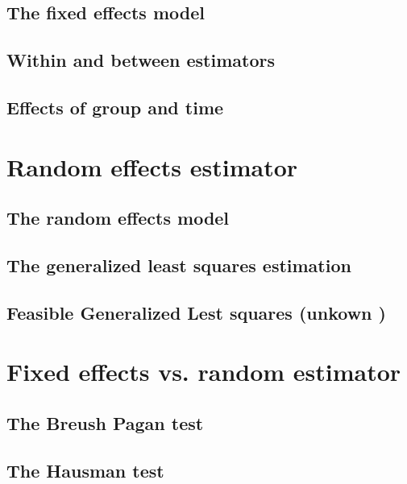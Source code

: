 \begin{multicols}{2}
\subsection{The fixed effects model}


\subsection{Within and between estimators}


\subsection{Effects of group and time}


\end{multicols}

\section{Random effects estimator} %
\begin{multicols}{2}
\subsection{The random effects model}


\subsection{The generalized least squares estimation}


\subsection{Feasible Generalized Lest squares (unkown )}



\end{multicols}


\section{Fixed effects vs. random estimator} %
\begin{multicols}{2}
\subsection{The Breush Pagan test}


\subsection{The Hausman test}



\end{multicols}


